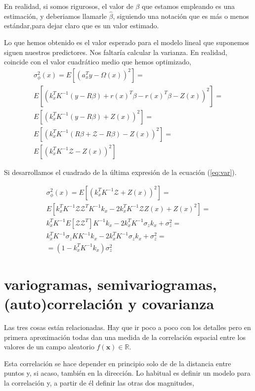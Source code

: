 \documentclass[10pt,a4paper]{report}
\begin{document}
En realidad, si somos rigurosos, el valor de $\beta$ que estamos empleando es una estimación, y deberiamos llamarle $\hat{\beta}$, siguiendo una notación que es más o menos estándar,para dejar claro que es un valor estimado.

Lo que hemos obtenido es el valor esperado para el modelo lineal que suponemos siguen nuestros predictores. Nos faltaría calcular la varianza. En realidad, coincide con el valor cuadrático medio que hemos optimizado,
\begin{equation}\label{eq:var}
\begin{split}
\sigma_{\phi}^2(x) = E[(a_x^Ty-\Omega(x))^2] =\\
E[(k_x^TK^{-1}(y-R\beta)+r(x)^T\beta-r(x)^T\beta-Z(x))^2] =\\
E[(k_x^TK^{-1}(y-R\beta)+Z(x))^2]=\\
E[(k_x^TK^{-1}(R\beta+\mathcal{Z}-R\beta)-Z(x))^2]=\\
E[(k_x^TK^{-1}\mathcal{Z}-Z(x))^2]
\end{split}
\end{equation}

Si desarrollamos el cuadrado de la última expresión de la ecuación (\ref{eq:var}). 

\begin{equation}
\begin{split}
\sigma_{\phi}^2(x) = E[(k_x^TK^{-1}\mathcal{Z}+Z(x))^2]=\\
E\left[k_x^TK^{-1}\mathcal{Z}\mathcal{Z}^TK^{-1}k_x -2k_x^TK^{-1}\mathcal{Z}Z(x)+ Z(x)^2\right]=\\
k_x^TK^{-1}E[\mathcal{Z}\mathcal{Z}^T]K^{-1}k_x -2k_x^TK^{-1}\sigma_zk_x+\sigma_z^2=\\
k_x^TK^{-1}\sigma_zKK^{-1}k_x - 2k_x^TK^{-1}\sigma_zk_x+\sigma_z^2=\\
= (1-k_x^TK^{-1}k_x)\sigma_z^2
\end{split}
\end{equation}
\section{variogramas, semivariogramas, (auto)correlación y covarianza}
Las tres cosas están relacionadas. Hay que ir poco a poco con los detalles pero en primera aproximación todas dan una medida de la correlación espacial entre los valores de un campo aleatorio $f(\mathbf{x}) \in \mathbb{R}$.

Esta correlación se hace depender en principio solo de de la distancia entre puntos y, si acaso, también en la dirección. Lo habitual es definir un modelo para la correlación y, a partir de él definir las otras dos magnitudes,
\end{document}
